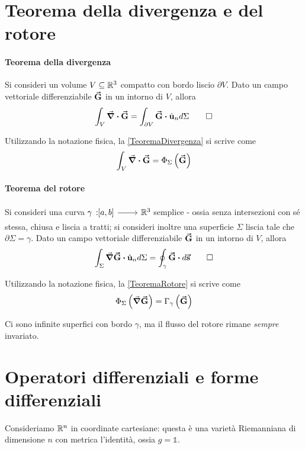 \section{Teorema della divergenza e del rotore}
\paragraph{Teorema della divergenza}
\begin{theoremaqed}
	Si consideri un volume $V\subseteq\mathbb{R}^3$ compatto con bordo liscio $\partial V$. Dato un campo vettoriale differenziabile $\vb*{\va{G}}$ in un intorno di $V$, allora
	\begin{equation}
		\int_V\div{\vba{G}}=\int_{\partial V}\vba{G}\vdot \vbh{u}_nd\Sigma\label{TeoremaDivergenza}\qedhere
	\end{equation}
\end{theoremaqed}
Utilizzando la notazione fisica, la \ref{TeoremaDivergenza} si scrive come
\begin{equation}
	\int_V\div{\vb*{\va{G}}}=\Phi_\Sigma\left(\vb*{\va{G}}\right)
\end{equation}
\paragraph{Teorema del rotore}
\begin{theoremaqed}
	Si consideri una curva $\funz[\gamma]{\left[a,b\right]}{\realset^3}$ semplice - ossia senza intersezioni con sé stessa, chiusa e liscia a tratti; si consideri inoltre una superficie $\Sigma$ liscia tale che $\partial \Sigma=\gamma$. Dato un campo vettoriale differenziabile $\vb*{\va{G}}$ in un intorno di $V$, allora
	\begin{equation}
		\int_\Sigma\grad{\vba{G}}\vdot\vbh{u}_nd\Sigma=\oint_{\gamma}\vba{G}\vdot d\vba{s}\label{TeoremaRotore}\qedhere
	\end{equation}
\end{theoremaqed}
Utilizzando la notazione fisica, la \ref{TeoremaRotore} si scrive come
\begin{equation}
	\Phi_\Sigma\left(\grad{\vb*{\va{G}}}\right)=\Gamma_\gamma\left(\vb*{\va{G}}\right)
\end{equation}
\begin{observe}
	Ci sono infinite superfici con bordo $\gamma$, ma il flusso del rotore rimane \textit{sempre} invariato.
\end{observe}
\section{Operatori differenziali e forme differenziali}
Consideriamo $\mathbb{R}^n$ in coordinate cartesiane: questa è una varietà Riemanniana di dimensione $n$ con metrica l'identità, ossia $g=\mathbb{1}$.\\
